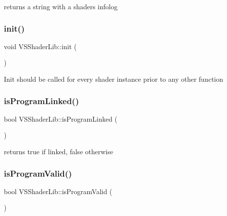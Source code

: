 returns a string with a shader\textquotesingle{}s infolog 

\mbox{\label{class_v_s_shader_lib_ad505b7bf7748f8ef6089b4f9d5c516b1}} 
\subsubsection{\texorpdfstring{init()}{init()}}
{\footnotesize\ttfamily void V\+S\+Shader\+Lib\+::init (\begin{DoxyParamCaption}{ }\end{DoxyParamCaption})}

Init should be called for every shader instance prior to any other function \mbox{\label{class_v_s_shader_lib_ae60f0930d5a3b7377bf732deae0e8eea}} 
\subsubsection{\texorpdfstring{is\+Program\+Linked()}{isProgramLinked()}}
{\footnotesize\ttfamily bool V\+S\+Shader\+Lib\+::is\+Program\+Linked (\begin{DoxyParamCaption}{ }\end{DoxyParamCaption})}



returns true if linked, false otherwise 

\mbox{\label{class_v_s_shader_lib_a141ac8a185556cdc20615472d1645d79}} 
\subsubsection{\texorpdfstring{is\+Program\+Valid()}{isProgramValid()}}
{\footnotesize\ttfamily bool V\+S\+Shader\+Lib\+::is\+Program\+Valid (\begin{DoxyParamCaption}{ }\end{DoxyParamCaption})}



